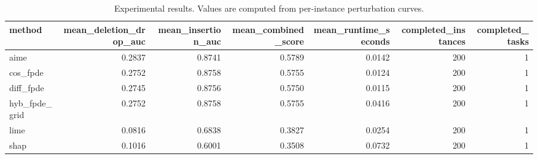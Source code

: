 \begin{table}[t]
\caption{Experimental results. Values are computed from per-instance perturbation curves.}
\label{tab:main_results_computed}
\centering
\begin{tabular}{lrrrrrr}
\toprule
method & mean\_deletion\_drop\_auc & mean\_insertion\_auc & mean\_combined\_score & mean\_runtime\_seconds & completed\_instances & completed\_tasks \\
\midrule
aime & 0.2837 & 0.8741 & 0.5789 & 0.0142 & 200 & 1 \\
cos\_fpde & 0.2752 & 0.8758 & 0.5755 & 0.0124 & 200 & 1 \\
diff\_fpde & 0.2745 & 0.8756 & 0.5750 & 0.0115 & 200 & 1 \\
hyb\_fpde\_grid & 0.2752 & 0.8758 & 0.5755 & 0.0416 & 200 & 1 \\
lime & 0.0816 & 0.6838 & 0.3827 & 0.0254 & 200 & 1 \\
shap & 0.1016 & 0.6001 & 0.3508 & 0.0732 & 200 & 1 \\
\bottomrule
\end{tabular}

\end{table}
